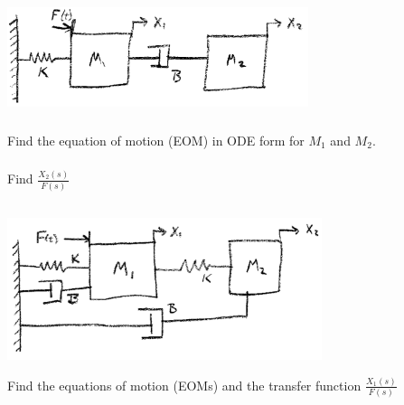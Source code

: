 \documentclass{article}	%
\begin{document}
\includegraphics[width=88mm]{00451a.png}

\subsubsection{} Find the equation of motion (EOM) in ODE form for $M_1$ and $M_2$.

%
%
%

\subsubsection{} Find $\frac{X_2(s)}{F(s)}$

%
%
%


\subsection{}


\includegraphics[width=92mm]{00452a.png}

Find the equations of motion (EOMs)  and the transfer function  $\frac{X_1(s)}{F(s)}$


%
%
%
\end{document}
